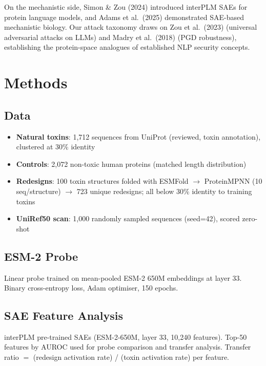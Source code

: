 \documentclass[11pt,a4paper]{article}
\begin{document}
On the mechanistic side, Simon \& Zou (2024) \cite{simon2024interplm} introduced interPLM
SAEs for protein language models, and Adams et al.\ (2025) \cite{adams2025saeplm} demonstrated
SAE-based mechanistic biology. Our attack taxonomy draws on Zou et al.\ (2023)
\cite{zou2023universal} (universal adversarial attacks on LLMs) and Madry et al.\ (2018)
\cite{madry2018pgd} (PGD robustness), establishing the protein-space analogues of established
NLP security concepts.

\section{Methods}

\subsection{Data}
\begin{itemize}
    \item \textbf{Natural toxins}: 1,712 sequences from UniProt (reviewed, toxin annotation), clustered at 30\% identity
    \item \textbf{Controls}: 2,072 non-toxic human proteins (matched length distribution)
    \item \textbf{Redesigns}: 100 toxin structures folded with ESMFold $\rightarrow$ ProteinMPNN (10 seq/structure) $\rightarrow$ 723 unique redesigns; all below 30\% identity to training toxins
    \item \textbf{UniRef50 scan}: 1,000 randomly sampled sequences (seed=42), scored zero-shot
\end{itemize}

\subsection{ESM-2 Probe}
Linear probe trained on mean-pooled ESM-2 650M embeddings at layer 33. Binary cross-entropy loss, Adam optimiser, 150 epochs.

\subsection{SAE Feature Analysis}
interPLM pre-trained SAEs (ESM-2-650M, layer 33, 10,240 features). Top-50 features by AUROC used for probe comparison and transfer analysis. Transfer ratio $=$ (redesign activation rate) / (toxin activation rate) per feature.
\end{document}
